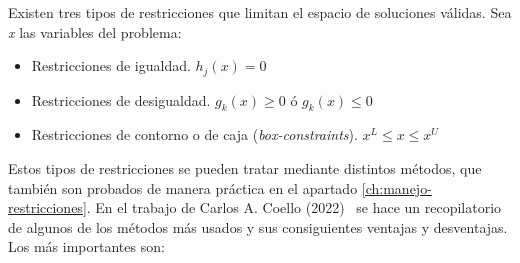 Existen tres tipos de restricciones que limitan el espacio de soluciones válidas. Sea \textit{x} las variables del problema:

\begin{itemize}
  \item Restricciones de igualdad. $h_j(x) = 0$
  \item Restricciones de desigualdad. $g_k(x) \geq 0$ ó $g_k(x) \leq 0$
  \item Restricciones de contorno o de caja (\textit{box-constraints}). $x^L \leq x \leq x^U$
\end{itemize}

Estos tipos de restricciones se pueden tratar mediante distintos métodos, que también son probados de manera práctica en el apartado \ref{ch:manejo-restricciones}. En el trabajo de Carlos A. Coello (2022)~\cite{Coello2022} se hace un recopilatorio de algunos de los métodos más usados y sus consiguientes ventajas y desventajas. Los más importantes son:

